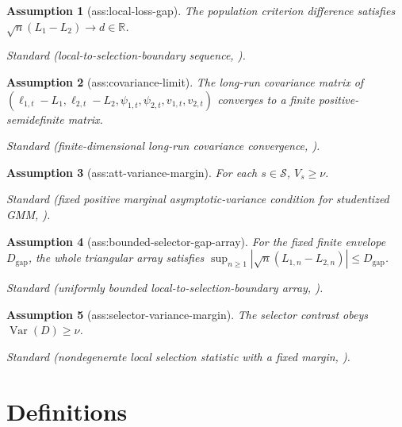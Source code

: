 \documentclass{article}
\newtheorem{assumption}{Assumption}
\begin{document}
\begin{assumption}[ass:local-loss-gap]\label{ass:local-loss-gap}
The population criterion difference satisfies \(\sqrt n(L_1-L_2)\to d\in\mathbb R\).
\par\smallskip\noindent\emph{Standard} (local-to-selection-boundary sequence, \cite{LeebPotscher2005}).
\end{assumption}

\begin{assumption}[ass:covariance-limit]\label{ass:covariance-limit}
The long-run covariance matrix of \((\ell_{1,t}-L_1,\ell_{2,t}-L_2,\psi_{1,t},\psi_{2,t},v_{1,t},v_{2,t})\) converges to a finite positive-semidefinite matrix.
\par\smallskip\noindent\emph{Standard} (finite-dimensional long-run covariance convergence, \cite{Lunde2019SampleSplitting}).
\end{assumption}

\begin{assumption}[ass:att-variance-margin]\label{ass:att-variance-margin}
For each \(s\in\mathcal S\), \(V_s\geq\nu\).
\par\smallskip\noindent\emph{Standard} (fixed positive marginal asymptotic-variance condition for studentized GMM, \cite{QiuShiMiaoDobribanTchetgen2024}).
\end{assumption}

\begin{assumption}[ass:bounded-selector-gap-array]\label{ass:bounded-selector-gap-array}
For the fixed finite envelope \(D_{\mathrm{gap}}\), the whole triangular array satisfies \(\sup_{n\geq1}|\sqrt n(L_{1,n}-L_{2,n})|\leq D_{\mathrm{gap}}\).
\par\smallskip\noindent\emph{Standard} (uniformly bounded local-to-selection-boundary array, \cite{LeebPotscher2005}).
\end{assumption}

\begin{assumption}[ass:selector-variance-margin]\label{ass:selector-variance-margin}
The selector contrast obeys \(\operatorname{Var}(D)\geq\nu\).
\par\smallskip\noindent\emph{Standard} (nondegenerate local selection statistic with a fixed margin, \cite{LeebPotscher2005}).
\end{assumption}

\section{Definitions}
\end{document}

